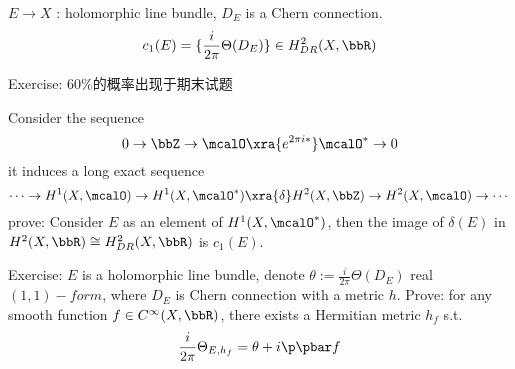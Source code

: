 $E\to X$ : holomorphic line bundle, $D_E$ is a Chern connection.
$$c_1(E)=\{\frac{i}{2\pi}\Theta(D_E)\}\in H_{DR}^2(X,\bbR)$$

Exercise:
{\color{red} $60\%$的概率出现于期末试题}

Consider the sequence
$$0\to\bbZ\to\mcalO\xra{e^{2\pi i *}}\mcalO^*\to 0$$
it induces a long exact sequence
$$\cdots\to
H^1(X,\mcalO)\to H^1(X,\mcalO^*)\xra{\delta}H^2(X,\bbZ)\to H^2(X,\mcalO)\to\cdots
$$
prove: Consider $E$ as an element of $H^1(X,\mcalO^*)$, then the
image of $\delta(E)$ in $H^2(X,\bbR)\cong H^2_{DR}(X,\bbR)$ is $c_1(E)$.

Exercise: $E$ is a holomorphic line bundle, denote
$\theta:=\frac{i}{2\pi}\Theta(D_E)$ real $(1,1)-form$,
where $D_E$ is Chern connection
with a metric $h$.
Prove: for any smooth function $f\in C^\infty(X,\bbR)$,
there exists a Hermitian metric $h_f$ s.t.
$$\frac{i}{2\pi}\Theta_{E,h_f}=\theta+i\p\pbar f$$


